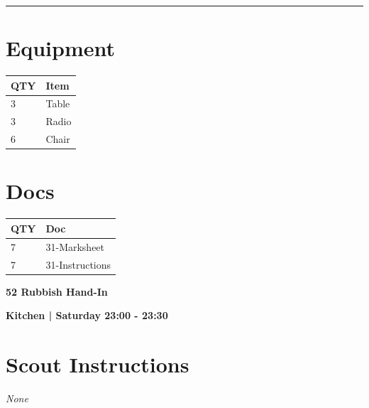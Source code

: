 \documentclass[10pt]{article}
\newcommand{\newtitle}[1]{\begin{center}{\Huge\bfseries #1 }\\ \vspace{5mm}\end{center}}
\newcommand{\newsubtitle}[1]{\begin{center}{\color{grey}\Large\bfseries #1 }\\ \vspace{5mm}\end{center}}
\begin{document}
			\vspace{0.5cm}
	\hrule
	\vspace{0.5cm}

	\begin{multicols}{2}

		\section*{\faWrench \: Equipment}

		
	\begin{center}
			\begin{tabular}{p{2cm}p{4cm}}


				\textbf{QTY} & \textbf{Item} \\\toprule
												3&Table\\\midrule
												3&Radio\\\midrule
												6&Chair\\\midrule
								\end{tabular}

			\end{center}

		
		\vfill\null
		\columnbreak

			\section*{\faFile \: Docs}
		 	\begin{center}
			\begin{tabular}{p{2cm}p{4cm}}

			\textbf{QTY} & \textbf{Doc} \\\toprule
										7&31-Marksheet\\\midrule
										7&31-Instructions\\\midrule
							\end{tabular}
			\end{center}
	

		\vfill\null

		\end{multicols}



	\vspace{1cm}


	\clearpage
		\newtitle{52 Rubbish Hand-In }
	\newsubtitle{Kitchen | Saturday 23:00 - 23:30}
		\setcounter{section}{51}
	\section*{Scout Instructions}
		\textit{None}
	
\end{document}
